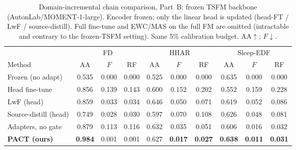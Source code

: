 \begin{table}[t]
\centering
\caption{Domain-incremental chain comparison, Part~B: frozen TSFM backbone
(AutonLab/MOMENT-1-large). Encoder frozen; only the linear head is updated
(head-FT / LwF / source-distill). Full fine-tune and EWC/MAS on the full FM
are omitted (intractable and contrary to the frozen-TSFM setting). Same 5\%
calibration budget. AA$\uparrow$; $F$$\downarrow$.}
\label{tab:chain-moment}
\small
\begin{tabular}{l ccc ccc ccc}
\toprule
& \multicolumn{3}{c}{FD} & \multicolumn{3}{c}{HHAR} & \multicolumn{3}{c}{Sleep-EDF}\\
\cmidrule(lr){2-4}\cmidrule(lr){5-7}\cmidrule(lr){8-10}
Method & AA & $F$ & RF & AA & $F$ & RF & AA & $F$ & RF\\
\midrule
Frozen (no adapt) & 0.535 & 0.000 & 0.000 & 0.525 & 0.000 & 0.000 & 0.635 & 0.000 & 0.000\\
Head fine-tune & 0.856 & 0.139 & 0.143 & 0.600 & 0.152 & 0.202 & 0.552 & 0.159 & 0.228\\
LwF (head) & 0.859 & 0.033 & 0.034 & 0.646 & 0.050 & 0.071 & 0.619 & 0.052 & 0.086\\
Source-distill (head) & 0.749 & 0.028 & 0.030 & 0.597 & 0.070 & 0.108 & 0.626 & 0.048 & 0.081\\
Adapters, no gate & 0.879 & 0.113 & 0.116 & 0.632 & 0.035 & 0.051 & 0.606 & 0.016 & 0.032\\
\textbf{PACT (ours)} & \textbf{0.984} & 0.001 & 0.001 & 0.627 & \textbf{0.017} & \textbf{0.027} & \textbf{0.638} & \textbf{0.011} & \textbf{0.031}\\
\bottomrule
\end{tabular}
\end{table}

